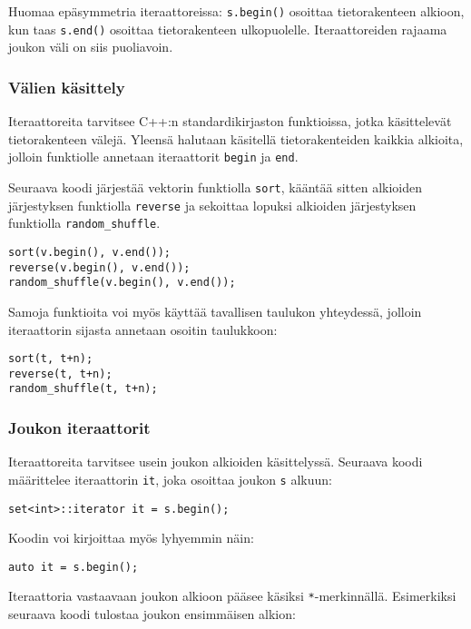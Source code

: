 Huomaa epäsymmetria iteraattoreissa:
\texttt{s.begin()} osoittaa tietorakenteen alkioon,
kun taas \texttt{s.end()} osoittaa tietorakenteen ulkopuolelle.
Iteraattoreiden rajaama joukon väli on siis puoliavoin.

\subsubsection{Välien käsittely}

Iteraattoreita tarvitsee
C++:n standardikirjaston funktioissa, jotka käsittelevät
tietorakenteen välejä.
Yleensä halutaan käsitellä tietorakenteiden kaikkia
alkioita, jolloin funktiolle annetaan
iteraattorit \texttt{begin} ja \texttt{end}.

Seuraava koodi järjestää vektorin funktiolla \texttt{sort},
kääntää sitten alkioiden järjestyksen funktiolla \texttt{reverse}
ja sekoittaa lopuksi alkioiden järjestyksen funktiolla \texttt{random\_shuffle}.


\begin{lstlisting}
sort(v.begin(), v.end());
reverse(v.begin(), v.end());
random_shuffle(v.begin(), v.end());
\end{lstlisting}

Samoja funktioita voi myös käyttää tavallisen taulukon
yhteydessä, jolloin iteraattorin sijasta annetaan
osoitin taulukkoon:

\begin{lstlisting}
sort(t, t+n);
reverse(t, t+n);
random_shuffle(t, t+n);
\end{lstlisting}

\subsubsection{Joukon iteraattorit}

Iteraattoreita tarvitsee usein joukon
alkioiden käsittelyssä.
Seuraava koodi määrittelee iteraattorin
\texttt{it}, joka osoittaa joukon \texttt{s} alkuun:
\begin{lstlisting}
set<int>::iterator it = s.begin();
\end{lstlisting}
Koodin voi kirjoittaa myös lyhyemmin näin:
\begin{lstlisting}
auto it = s.begin();
\end{lstlisting}
Iteraattoria vastaavaan joukon alkioon
pääsee käsiksi \texttt{*}-merkinnällä.
Esimerkiksi seuraava koodi tulostaa
joukon ensimmäisen alkion:


